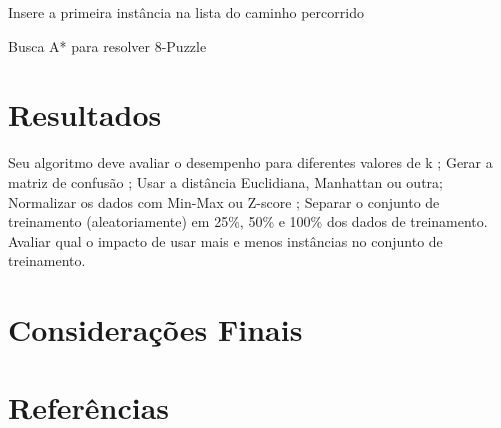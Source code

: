 \documentclass[12pt]{article}
\begin{document}
		\begin{algorithm}[H]
			Insere a primeira instância na lista do caminho percorrido\;
			\caption{Busca A* para resolver 8-Puzzle}
		\end{algorithm}



	\section{Resultados}\label{sec:resultados}

	
Seu algoritmo deve avaliar o desempenho para diferentes valores de k ;
Gerar a matriz de confusão ;
Usar a distância Euclidiana, Manhattan ou outra;
Normalizar os dados com Min-Max ou Z-score ;
Separar o conjunto de treinamento (aleatoriamente) em 25\%, 50\% e 100\% dos dados de treinamento. Avaliar qual o impacto de usar mais e menos instâncias no conjunto de treinamento.



	\section{Considerações Finais}\label{sec:consideracoesFinais}

		

	\section{Referências}\label{sec:referencias}

		
\end{document}
